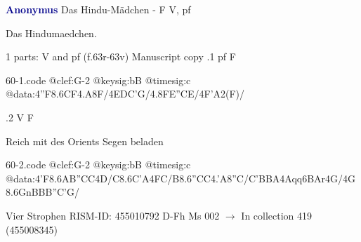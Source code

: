\documentclass[twocolumn]{book}
\begin{document}
\newline \par \vspace{7pt} \textcolor{darkblue}{\textbf{Anonymus  }}
\newline Das Hindu-Mädchen - F
\newline V, pf
\newline \begin{itshape}[heading, f.63r:] Das Hindumaedchen.\end{itshape} 
\newline \textcolor{darkblue}{}  1 parts: V and pf  (f.63r-63v)
\newline Manuscript copy
.1  pf  F  
\begin{filecontents*}{60-1.code}
@clef:G-2
@keysig:bB
@timesig:c
@data:4''F{8.6CF}4.A8F/4EDC'G/4.8FE''CE/4F'A2(F)/
\end{filecontents*}
\newline
%

.2  V  F
\newline \begin{footnotesize} Reich mit des Orients Segen beladen \end{footnotesize}  
\begin{filecontents*}{60-2.code}
@clef:G-2
@keysig:bB
@timesig:c
@data:4'F{8.6AB}{''CC}4D/C{8.6C'A}4FC/B{8.6''CC}4.'A8''C/C'BBA4Aqq6BAr4G/4G8.6GnB{BB}''C'G/
\end{filecontents*}
\newline
%

\newline Vier Strophen
\newline RISM-ID: 455010792
\newline D-Fh  Ms 002
\newline $\rightarrow$ In collection 419 (455008345)
      
\end{document}
